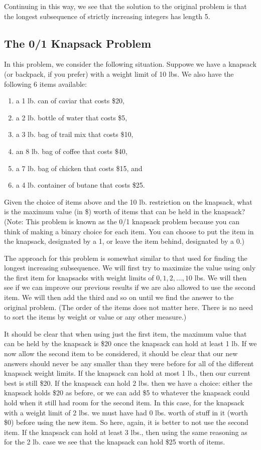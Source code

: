\documentclass{ximera}
\begin{document}
Continuing in this way, we see that the solution to the original problem is that the longest subsequence of strictly increasing integers has length 5.

\subsection{The 0/1 Knapsack Problem}

In this problem, we consider the following situation. Suppowe we have a knapsack (or backpack, if you prefer) with a weight limit of 10 lbs. We also have the following 6 items available:
\begin{enumerate}
	\item a 1 lb. can of caviar that costs \$20,
	\item a 2 lb. bottle of water that costs \$5,
	\item a 3 lb. bag of trail mix that costs \$10,
	\item an 8 lb. bag of coffee that costs \$40,
	\item a 7 lb. bag of chicken that costs \$15, and
	\item a 4 lb. container of butane that costs \$25.
\end{enumerate}
Given the choice of items above and the 10 lb. restriction on the knapsack, what is the maximum value (in \$) worth of items that can be held in the knapsack? (Note: This problem is known as the 0/1 knapsack problem because you can think of making a binary choice for each item. You can choose to put the item in the knapsack, designated by a 1, or leave the item behind, designated by a 0.)

The approach for this problem is somewhat similar to that used for finding the longest increasing subsequence. We will first try to maximize the value using only the first item for knapsacks with weight limits of $0,1,2,\dots,10$ lbs. We will then see if we can improve our previous results if we are also allowed to use the second item. We will then add the third and so on until we find the answer to the original problem. (The order of the items does not matter here. There is no need to sort the items by weight or value or any other measure.)

It should be clear that when using just the first item, the maximum value that can be held by the knapsack is \$20 once the knapsack can hold at least 1 lb. If we now allow the second item to be considered, it should be clear that our new answers should never be any smaller than they were before for all of the different knapsack weight limits. If the knapsack can hold at most 1 lb., then our current best is still \$20. If the knapsack can hold 2 lbs. then we have a choice: either the knapsack holds \$20 as before, or we can add \$5 to whatever the knapsack could hold when it still had room for the second item. In this case, for the knapsack with a weight limit of 2 lbs. we must have had 0 lbs. worth of stuff in it (worth \$0) before using the new item. So here, again, it is better to not use the second item. If the knapsack can hold at least 3 lbs., then using the same reasoning as for the 2 lb. case we see that the knapsack can hold \$25 worth of items.
\end{document}
